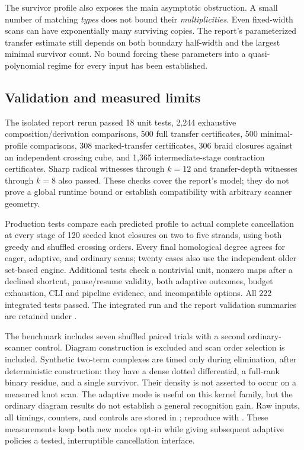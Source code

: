 The survivor profile also exposes the main asymptotic obstruction.
A small number of matching \emph{types} does not bound their
\emph{multiplicities}. Even fixed-width scans can have exponentially
many surviving copies. The report's parameterized transfer estimate
still depends on both boundary half-width and the largest minimal
survivor count. No bound forcing these parameters into a
quasi-polynomial regime for every input has been established.

\subsection{Validation and measured limits}
The isolated report rerun passed 18 unit tests, 2,244 exhaustive
composition/derivation comparisons, 500 full transfer certificates,
500 minimal-profile comparisons, 308 marked-transfer certificates,
306 braid closures against an independent crossing cube, and 1,365
intermediate-stage contraction certificates. Sharp radical witnesses
through $k=12$ and transfer-depth witnesses through $k=8$ also passed.
These checks cover the report's model; they do not prove a global
runtime bound or establish compatibility with arbitrary scanner geometry.

Production tests compare each predicted profile to actual complete
cancellation at every stage of 120 seeded knot closures on two to
five strands, using both greedy and shuffled crossing orders. Every
final homological degree agrees for eager, adaptive, and ordinary
scans; twenty cases also use the independent older set-based engine.
Additional tests check a nontrivial unit, nonzero maps after a declined
shortcut, pause/resume validity, both adaptive outcomes, budget
exhaustion, CLI and pipeline evidence, and incompatible options.
All 222 integrated tests passed. The integrated run and the report validation summaries are retained
under .



The benchmark includes seven shuffled paired trials with a second
ordinary-scanner control. Diagram construction is excluded and scan
order selection is included. Synthetic two-term complexes are timed
only during elimination, after deterministic construction: they have
a dense dotted differential, a full-rank binary residue, and a single
survivor. Their density is not asserted to occur on a measured knot
scan. The adaptive mode is useful on this kernel family, but the
ordinary diagram results do not establish a general recognition gain.
Raw inputs, all timings, counters, and controls are stored in
; reproduce with
. These measurements keep both new
modes opt-in while giving subsequent adaptive policies a tested,
interruptible cancellation interface.
